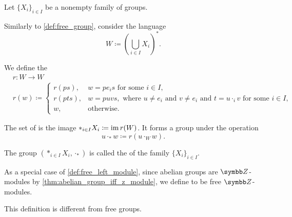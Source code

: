 \begin{definition}\label{def:group_free_product}\cite[323]{Knapp2016BAlg}
  Let \( \{ X_i \}_{i \in I} \) be a nonempty family of groups.

  Similarly to \cref{def:free_group}, consider the language
  \begin{equation*}
    W \coloneqq \left( \bigcup_{i \in I} X_i \right)^{*}.
  \end{equation*}

  We define the 
  \begin{align*}
    &r: W \to W \\
    &r(w) \coloneqq \begin{cases}
      r(ps), &w = p e_i s \text{ for some } i \in I, \\
      r(pts), &w = puvs, \text{ where } u \neq e_i \text{ and } v \neq e_i \text{ and } t = u \cdot_i v \text{ for some } i \in I, \\
      w, &\text{otherwise}.
    \end{cases}
  \end{align*}

  The set of  is the image \( \ast_{i \in I} X_i \coloneqq \operatorname{im} r(W) \). It forms a group under the operation
  \begin{equation*}
    u \cdot_\ast w \coloneqq r(u \cdot_{W} w).
  \end{equation*}

  The group \( (\ast_{i \in I} X_i, \cdot_\ast) \) is called the  of the family \( \{ X_i \}_{i \in I} \).
\end{definition}

\begin{definition}\label{def:free_abelian_group}
  As a special case of \cref{def:free_left_module}, since abelian groups are \( \Z \)-modules by \cref{thm:abelian_group_iff_z_module}, we define  to be free \( \Z \)-modules.

  This definition is different from free groups.
\end{definition}

